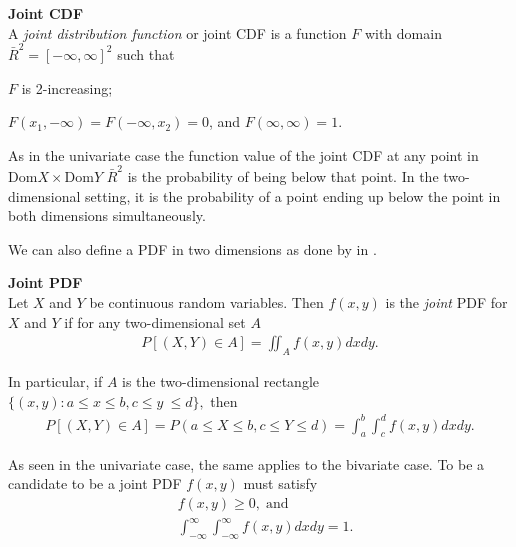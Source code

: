 \begin{definition}\label{def:JointCDF} \textbf{Joint CDF} \\
    A \emph{joint distribution function} or joint \gls{CDF} is a function $F$ with domain $\bar{R}^2 = [-\infty, \infty]^2$ such that 
    \begin{compactenum}
        \item $F$ is 2-increasing; 
        \item $F(x_1,-\infty)= F(-\infty, x_2) = 0$, and $F(\infty,\infty)=1$.
    \end{compactenum}
\end{definition}

As in the univariate case the function value of the joint \gls{CDF} at any point in $\mathrm{Dom}X\times\mathrm{Dom}Y$ $\bar{R}^2$ is the probability of being below that point. In the two-dimensional setting, it is the probability of a point ending up below the point in both dimensions simultaneously. 

We can also define a \gls{PDF} in two dimensions as done by \citet[p.~235]{DevoreBerk2012} in .

\begin{definition}\label{def:JointPDF} \textbf{Joint PDF} \\
    Let $X$ and $Y$ be continuous random variables. Then $f(x, y)$ is the \emph{joint} \gls{PDF} for $X$ and $Y$ if for any two-dimensional set $A$ 
    \begin{align*}
        P[(X,Y) \in A] =  \iint_A f(x,y)dxdy.
    \end{align*}
    
    In particular, if $A$ is the two-dimensional rectangle $\{(x,y) : a\leq x \leq b, c\leq y \ \leq d\}, $ then
    \begin{align*}
        P[(X,Y) \in A] = P(a\leq X \leq b, c \leq Y \leq d) =\int_a^b\!\!\!\int_c^d f(x,y)dxdy.
    \end{align*}
\end{definition}

\begin{remark}
    As seen in the univariate case, the same applies to the bivariate case. To be a candidate to be a joint \gls{PDF} $f(x,y)$ must satisfy 
    \begin{align*}
        &f(x,y) \geq 0, \;\mathrm{and} \\
        &\int_{-\infty}^{\infty}\!\int_{-\infty}^{\infty}f(x,y)dxdy=1.
    \end{align*}    
\end{remark}


